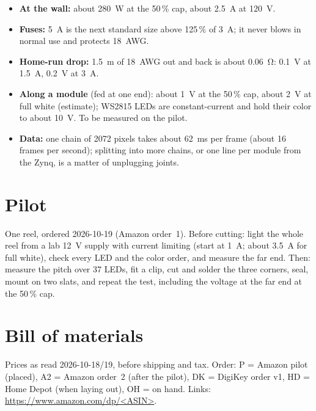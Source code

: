 \documentclass[11pt,letterpaper]{article}
\begin{document}
\begin{itemize}
  \item \textbf{At the wall:} about \SI{280}{W} at the 50\,\% cap, about \SI{2.5}{A} at \SI{120}{V}.
  \item \textbf{Fuses:} \SI{5}{A} is the next standard size above 125\,\% of \SI{3}{A}; it never blows in normal
    use and protects 18~AWG.
  \item \textbf{Home-run drop:} \SI{1.5}{m} of 18~AWG out and back is about \SI{0.06}{\ohm}:
    \SI{0.1}{V} at \SI{1.5}{A}, \SI{0.2}{V} at \SI{3}{A}.
  \item \textbf{Along a module} (fed at one end): about \SI{1}{V} at the 50\,\% cap, about \SI{2}{V} at full
    white (estimate); WS2815 LEDs are constant-current and hold their color to about \SI{10}{V}.  To be measured
    on the pilot.
  \item \textbf{Data:} one chain of 2072 pixels takes about \SI{62}{ms} per frame (about 16 frames per second);
    splitting into more chains, or one line per module from the Zynq, is a matter of unplugging joints.
\end{itemize}

\section{Pilot}
\label{sec:pilot}

One reel, ordered 2026-10-19 (Amazon order~1).  Before cutting: light the whole reel from a lab \SI{12}{V}
supply with current limiting (start at \SI{1}{A}; about \SI{3.5}{A} for full white), check every LED and the
color order, and measure the far end.  Then: measure the pitch over 37 LEDs, fit a clip, cut and solder the
three corners, seal, mount on two slats, and repeat the test, including the voltage at the far end at the
50\,\% cap.

\section{Bill of materials}
\label{sec:bom}

Prices as read 2026-10-18/19, before shipping and tax.  Order: P = Amazon pilot (placed), A2 = Amazon order~2
(after the pilot), DK = DigiKey order v1, HD = Home Depot (when laying out), OH = on hand.
Links: \url{https://www.amazon.com/dp/<ASIN>}.
\end{document}

